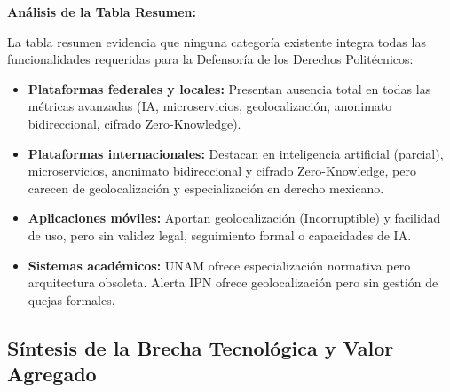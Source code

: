 \begin{flushleft}
\justifying

\textbf{Análisis de la Tabla Resumen:}

La tabla resumen evidencia que ninguna categoría existente integra todas las funcionalidades requeridas para la Defensoría de los Derechos Politécnicos:

\begin{itemize}
    \item \textbf{Plataformas federales y locales:} Presentan ausencia total en todas las métricas avanzadas (IA, microservicios, geolocalización, anonimato bidireccional, cifrado Zero-Knowledge).
    
    \item \textbf{Plataformas internacionales:} Destacan en inteligencia artificial (parcial), microservicios, anonimato bidireccional y cifrado Zero-Knowledge, pero carecen de geolocalización y especialización en derecho mexicano.
    
    \item \textbf{Aplicaciones móviles:} Aportan geolocalización (Incorruptible) y facilidad de uso, pero sin validez legal, seguimiento formal o capacidades de IA.
    
    \item \textbf{Sistemas académicos:} UNAM ofrece especialización normativa pero arquitectura obsoleta. Alerta IPN ofrece geolocalización pero sin gestión de quejas formales.
\end{itemize}
\end{flushleft}


\subsection{Síntesis de la Brecha Tecnológica y Valor Agregado}

